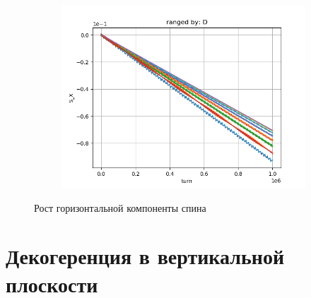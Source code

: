 \documentclass{article}
\begin{document}
\begin{figure}[!ht]\ContinuedFloat
  \begin{subfigure}[b]{1\textwidth}
    \includegraphics{img/S_X_vs_iteration_1_ranged_D}
  \end{subfigure}
  \caption{Рост горизонтальной компоненты спина}
\end{figure}

\section{Декогеренция в вертикальной плоскости}
\end{document}
